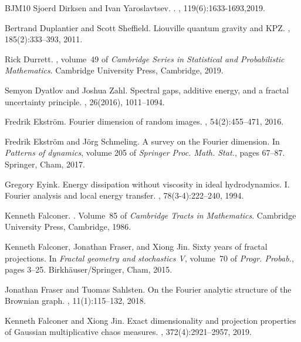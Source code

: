 \documentclass[12pt]{amsart}
\theoremstyle{definition}
\theoremstyle{remark}
\numberwithin{equation}{section}
\begin{document}
\begin{thebibliography}{BJM10}
	Sjoerd Dirksen and Ivan Yaroslavtsev.
	.
	, 119(6):1633-1693,2019.
	
	Bertrand Duplantier and Scott Sheffield.
	\newblock Liouville quantum gravity and {KPZ}.
	, 185(2):333--393, 2011.
	
	Rick Durrett.
	, volume~49 of {\em Cambridge
		Series in Statistical and Probabilistic Mathematics}.
	\newblock Cambridge University Press, Cambridge, 2019.
	
	Semyon Dyatlov and Joshua Zahl.
	\newblock Spectral gaps, additive energy, and a fractal uncertainty principle.
	, 26(2016),
	1011–1094.
	
	Fredrik Ekstr\"{o}m.
	\newblock Fourier dimension of random images.
	, 54(2):455--471, 2016.
	
	Fredrik Ekstr\"{o}m and J\"{o}rg Schmeling.
	\newblock A survey on the {F}ourier dimension.
	\newblock In {\em Patterns of dynamics}, volume 205 of {\em Springer Proc.
		Math. Stat.}, pages 67--87. Springer, Cham, 2017.
	
	
	Gregory Eyink.
	\newblock  Energy dissipation without viscosity in ideal hydrodynamics. I. Fourier
	analysis and local energy transfer.
	, 78(3-4):222–240, 1994.
	
	
	Kenneth Falconer.
	. Volume~85 of {\em Cambridge Tracts in Mathematics}.
	\newblock Cambridge University Press, Cambridge, 1986.
	
	
	Kenneth Falconer, Jonathan Fraser, and Xiong Jin.
	\newblock Sixty years of fractal projections.
	\newblock In {\em Fractal geometry and stochastics {V}}, volume~70 of {\em
		Progr. Probab.}, pages 3--25. Birkh\"{a}user/Springer, Cham, 2015.
	
	Jonathan Fraser and Tuomas Sahlsten.
	\newblock On the {F}ourier analytic structure of the {B}rownian graph.
	, 11(1):115--132, 2018.
	
	
	Kenneth Falconer and Xiong Jin.
	\newblock Exact dimensionality and projection properties of {G}aussian
	multiplicative chaos measures.
	, 372(4):2921--2957, 2019.
	

\end{thebibliography}
\end{document}
